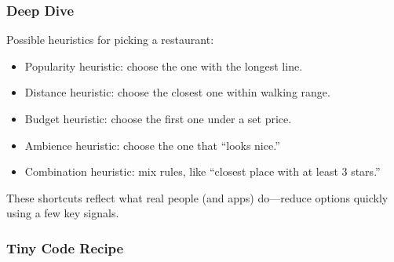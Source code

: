 \documentclass[
  letterpaper,
  DIV=11,
  numbers=noendperiod]{scrreprt}
\providecommand{\tightlist}{%
  \setlength{\itemsep}{0pt}\setlength{\parskip}{0pt}}
\begin{document}
\subsubsection{Deep Dive}\label{deep-dive-60}

Possible heuristics for picking a restaurant:

\begin{itemize}
\tightlist
\item
  Popularity heuristic: choose the one with the longest line.
\item
  Distance heuristic: choose the closest one within walking range.
\item
  Budget heuristic: choose the first one under a set price.
\item
  Ambience heuristic: choose the one that ``looks nice.''
\item
  Combination heuristic: mix rules, like ``closest place with at least 3
  stars.''
\end{itemize}

These shortcuts reflect what real people (and apps) do---reduce options
quickly using a few key signals.

\subsubsection{Tiny Code Recipe}\label{tiny-code-recipe-88}
\end{document}
